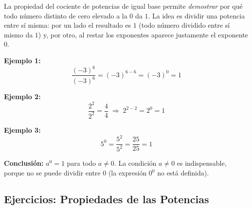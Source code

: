 \documentclass[12pt, letterpaper]{article}
\begin{document}
La propiedad del cociente de potencias de igual base permite \emph{demostrar} por qué todo número distinto de cero elevado a la $0$ da $1$. La idea es dividir una potencia entre sí misma: por un lado el resultado es $1$ (todo número dividido entre sí mismo da $1$) y, por otro, al restar los exponentes aparece justamente el exponente $0$.

\noindent\textbf{Ejemplo 1:}
\[
  \frac{(-3)^6}{(-3)^6} = (-3)^{6-6} = (-3)^0 = 1
\]

\noindent\textbf{Ejemplo 2:}
\[
  \frac{2^2}{2^2} = \frac{4}{4} \;\Rightarrow\; 2^{2-2} = 2^0 = 1
\]

\noindent\textbf{Ejemplo 3:}
\[
  5^0 = \frac{5^2}{5^2} = \frac{25}{25} = 1
\]

\begin{cuadroadvertencia}
  \textbf{Conclusión:} $a^0 = 1$ para todo $a \neq 0$. La condición $a \neq 0$ es indispensable, porque no se puede dividir entre $0$ (la expresión $0^0$ no está definida).
\end{cuadroadvertencia}

\subsection{Ejercicios: Propiedades de las Potencias}
\end{document}
